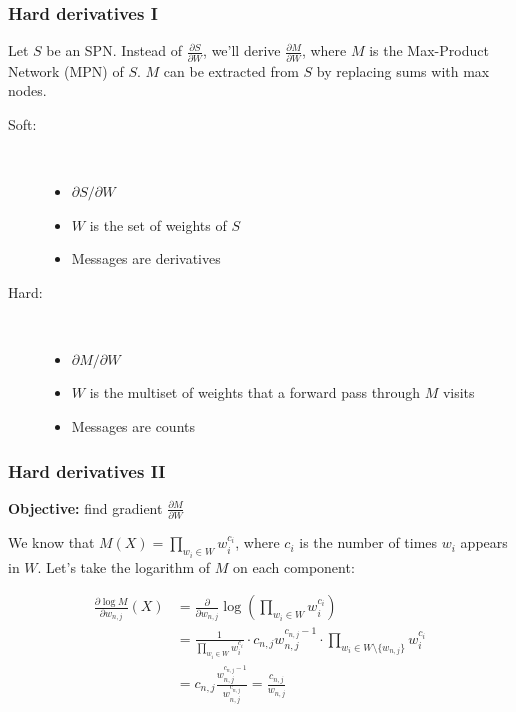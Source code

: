 \documentclass{beamer}
\newcommand{\ddspn}[2]{\frac{\partial#1}{\partial#2}}
\newcommand{\iddspn}[2]{\partial#1/\partial#2}
\begin{document}
\begin{frame}
  \frametitle{Hard derivatives I}

  Let $S$ be an SPN. Instead of $\ddspn{S}{W}$, we'll derive $\ddspn{M}{W}$, where $M$ is the
  Max-Product Network (MPN) of $S$. $M$ can be extracted from $S$ by replacing sums with max nodes.

  \begin{description}
    \item[Soft:]~\\
      \begin{itemize}
        \item $\iddspn{S}{W}$
        \item $W$ is the set of weights of $S$
        \item Messages are derivatives
      \end{itemize}
    \item[Hard:]~\\
      \begin{itemize}
        \item $\iddspn{M}{W}$
        \item $W$ is the multiset of weights that a forward pass through $M$ visits
        \item Messages are counts
      \end{itemize}
  \end{description}
\end{frame}

\begin{frame}
  \frametitle{Hard derivatives II}

  \begin{center}
    \textbf{Objective:} find gradient $\ddspn{M}{W}$
  \end{center}

  We know that $M(X)=\prod_{w_i\in W} w_i^{c_i}$, where $c_i$ is the number of times $w_i$ appears
  in $W$. Let's take the logarithm of $M$ on each component:

  \begin{align*}
    \ddspn{\log M}{w_{n,j}}(X)&=\ddspn{}{w_{n,j}}\log\left(\prod_{w_i\in W}w_i^{c_i}\right)\\
                              &=\frac{1}{\prod_{w_i\in W}w_i^{c_i}}\cdot c_{n,j}w_{n,j}^{c_{n,j}-1}
    \cdot\prod_{w_i\in W\setminus\{w_{n,j}\}}w_i^{c_i}\\
                              &=c_{n,j}\frac{w_{n,j}^{c_{n,j}-1}}{w_{n,j}^{c_{n,j}}}
                              =\frac{c_{n,j}}{w_{n,j}}
  \end{align*}
\end{frame}
\end{document}
